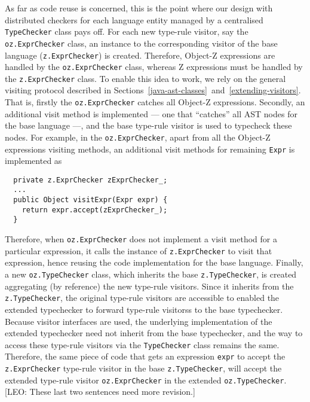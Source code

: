 \documentclass{llncs}
\begin{document}
As far as code reuse is concerned, this is the point where our design
with distributed checkers for each language entity managed by a
centralised {\tt TypeChecker} class pays off.
For each new type-rule visitor, say the {\tt oz.ExprChecker} class, an
instance to the corresponding visitor of the base language
({\tt z.ExprChecker}) is created. Therefore, Object-Z expressions are
handled by the {\tt oz.ExprChecker} class, whereas Z expressions must
be handled by the {\tt z.ExprChecker} class.
To enable this idea to work, we rely on the general visiting protocol
described in Sections~\ref{java-ast-classes}~and~\ref{extending-visitors}.
That is, firstly the {\tt oz.ExprChecker} catches all Object-Z expressions.
Secondly, an additional visit method is implemented --- one that ``catches'' all
AST nodes for the base language ---, and the base type-rule visitor is used to
typecheck these nodes.
For example, in the {\tt oz.ExprChecker}, apart from all the Object-Z expressions
visiting methods, an additional visit methods for remaining {\tt Expr} is implemented as
%
\begin{verbatim}
  private z.ExprChecker zExprChecker_;
  ...
  public Object visitExpr(Expr expr) {
    return expr.accept(zExprChecker_);
  }
\end{verbatim}
%
Therefore, when {\tt oz.ExprChecker} does not implement a visit method for
a particular expression, it calls the instance of {\tt z.ExprChecker} to visit
that expression, hence reusing the code implementation for the base language.
Finally, a new {\tt oz.TypeChecker} class, which inherits the base {\tt z.TypeChecker},
is created aggregating (by reference) the new type-rule visitors.
Since it inherits from the {\tt z.TypeChecker}, the original type-rule visitors
are accessible to enabled the extended typechecker to forward type-rule visitorss to the base typechecker.
Because visitor interfaces are used, the underlying implementation of the extended typechecker
need not inherit from the base typechecker, and the way to access these type-rule visitors via
the {\tt TypeChecker} class remains the same.
Therefore, the same piece of code that gets an expression {\tt expr} to accept the {\tt z.ExprChecker}
type-rule visitor in the base {\tt z.TypeChecker}, will accept the extended type-rule visitor
{\tt oz.ExprChecker} in the extended {\tt oz.TypeChecker}.
[LEO: These last two sentences need more revision.]
\end{document}
